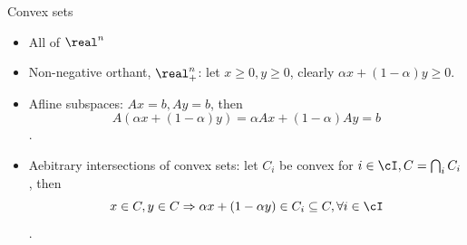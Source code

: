 \documentclass[notes]{beamer}
\begin{document}
\begin{frame}{Convex sets} 
	\begin{example}
		\begin{itemize}
			\item All of $\real^n$
			\item Non-negative orthant, $\real_+^n$: let $x \ge 0, y\ge 0$, clearly $\alpha x + (1-\alpha) y \ge 0$. 
			\item Afline subspaces: $Ax=b, Ay=b$, then 
			$$A(\alpha x+(1-\alpha) y)=\alpha Ax + (1-\alpha)Ay = b$$. 
			\item Aebitrary intersections of convex sets: let $C_i$ be convex for $i\in \cI, C = \bigcap_i C_i$, then 
			$$x\in C,y\in C \Rightarrow \alpha x +(1-\alpha y) \in C_i \subseteq C, \forall i \in \cI $$.
		\end{itemize}
	\end{example}
\end{frame}
\end{document}
